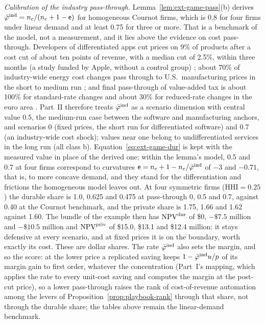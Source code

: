 \noindent\emph{Calibration of the industry pass-through.} Lemma~\ref{lem:ext-game-pass}(b) derives $\bar\varphi^{\rm ind}=n_c/(n_c+1-\mathsf e)$ for homogeneous Cournot firms, which is 0.8 for four firms under linear demand and at least 0.75 for three or more. That is a benchmark of the model, not a measurement, and it lies above the evidence on cost pass-through. Developers of differentiated apps cut prices on 9\% of products after a cost cut of about ten points of revenue, with a median cut of 2.5\%, within three months (a study funded by Apple, without a control group) \citep{choi2025dma}; about 70\% of industry-wide energy cost changes pass through to U.S.\ manufacturing prices in the short to medium run \citep{ganapati2020energy}; and final pass-through of value-added tax is about 100\% for standard-rate changes and about 30\% for reduced-rate changes in the euro area \citep{benedek2015vat}. Part~II therefore treats $\bar\varphi^{\rm ind}$ as a scenario dimension with central value 0.5, the medium-run case between the software and manufacturing anchors, and scenarios 0 (fixed prices, the short run for differentiated software) and 0.7 (an industry-wide cost shock); values near one belong to undifferentiated services in the long run (all class b). Equation~\eqref{eq:ext-game-dur} is kept with the measured value in place of the derived one; within the lemma's model, 0.5 and 0.7 at four firms correspond to curvatures $\mathsf e=n_c+1-n_c/\bar\varphi^{\rm ind}$ of $-3$ and $-0.71$, that is, to more concave demand, and they stand for the differentiation and frictions the homogeneous model leaves out. At four symmetric firms ($\mathrm{HHI}=0.25$) the durable share is 1.0, 0.625 and 0.475 at pass-through 0, 0.5 and 0.7, against 0.40 at the Cournot benchmark, and the private share is 1.75, 1.66 and 1.62 against 1.60. The bundle of the example then has $\mathrm{NPV}^{\rm dur}$ of \$0, $-\$7.5$ million and $-\$10.5$ million and $\mathrm{NPV}^{\rm priv}$ of \$15.0, \$13.1 and \$12.4 million: it stays defensive at every scenario, and at fixed prices it is on the boundary, worth exactly its cost. These are dollar shares. The rate $\bar\varphi^{\rm ind}$ also sets the margin, and so the score: at the lower price a replicated saving keeps $1-\bar\varphi^{\rm ind}u/p$ of its margin gain to first order, whatever the concentration (Part~I's mapping, which applies the rate to every unit-cost saving and computes the margin at the post-cut price), so a lower pass-through raises the rank of cost-of-revenue automation among the levers of Proposition~\ref{prop:playbook-rank} through that share, not through the durable share; the tables above remain the linear-demand benchmark.
